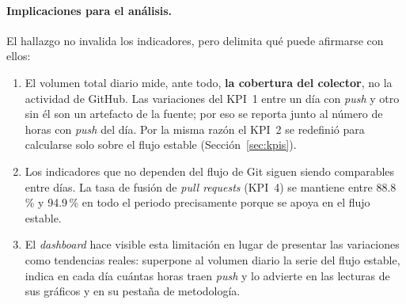 \paragraph{Implicaciones para el análisis.} El hallazgo no invalida los indicadores, pero delimita qué puede afirmarse con ellos:

\begin{enumerate}[leftmargin=*]
    \item El volumen total diario mide, ante todo, \textbf{la cobertura del colector}, no la actividad de GitHub. Las variaciones del KPI~1 entre un día con \textit{push} y otro sin él son un artefacto de la fuente; por eso se reporta junto al número de horas con \textit{push} del día. Por la misma razón el KPI~2 se redefinió para calcularse solo sobre el flujo estable (Sección~\ref{sec:kpis}).
    \item Los indicadores que no dependen del flujo de Git siguen siendo comparables entre días. La tasa de fusión de \textit{pull requests} (KPI~4) se mantiene entre 88.8\,\% y 94.9\,\% en todo el periodo precisamente porque se apoya en el flujo estable.
    \item El \textit{dashboard} hace visible esta limitación en lugar de presentar las variaciones como tendencias reales: superpone al volumen diario la serie del flujo estable, indica en cada día cuántas horas traen \textit{push} y lo advierte en las lecturas de sus gráficos y en su pestaña de metodología.
\end{enumerate}
